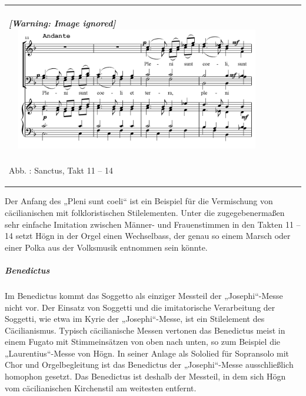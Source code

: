 \documentclass[a4paper]{article}
\newcounter{Abb}
\renewcommand\theAbb{\arabic{Abb}}
\begin{document}
\begin{center}
\tablefirsthead{}
\tablehead{}
\tabletail{}
\tablelasttail{}
\begin{supertabular}{m{11.689cm}}
\subparagraph[]{  [Warning: Image ignored]
\includegraphics[width=11.506cm,height=5.355cm]{pictures/zulassungsarbeit-img121.png}
 }
Abb. \stepcounter{Abb}{\theAbb}: Sanctus, Takt 11 – 14\\
\end{supertabular}
\end{center}
Der Anfang des „Pleni sunt coeli“ ist ein Beispiel für die Vermischung
von cäcilianischen mit folkloristischen Stilelementen. Unter die
zugegebenermaßen sehr einfache Imitation zwischen Männer- und
Frauenstimmen in den Takten 11 – 14 setzt Högn in der Orgel einen
Wechselbass, der genau so einem Marsch oder einer Polka aus der
Volksmusik entnommen sein könnte.

\subparagraph{Benedictus}
Im Benedictus kommt das Soggetto als einziger Messteil der
„Josephi“-Messe nicht vor. Der Einsatz von Soggetti und die
imitatorische Verarbeitung der Soggetti, wie etwa im Kyrie der
„Josephi“-Messe, ist ein Stilelement des Cäcilianismus. Typisch
cäcilianische Messen vertonen das Benedictus meist in einem Fugato mit
Stimmeinsätzen von oben nach unten, so zum Beispiel die
„Laurentius“-Messe von Högn. In seiner Anlage als Sololied für
Sopransolo mit Chor und Orgelbegleitung ist das Benedictus der
„Josephi“-Messe ausschließlich homophon gesetzt. Das Benedictus ist
deshalb der Messteil, in dem sich Högn vom cäcilianischen Kirchenstil
am weitesten entfernt.
\end{document}
